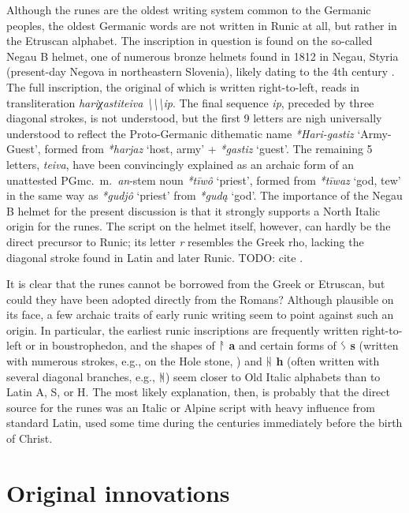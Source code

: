 Although the runes are the oldest writing system common to the Germanic peoples, the oldest Germanic words are not written in Runic at all, but rather in the Etruscan alphabet.  The inscription in question is found on the so-called Negau B helmet, one of numerous bronze helmets found in 1812 in Negau, Styria (present-day Negova in northeastern Slovenia), likely dating to the 4th century \bce.  The full inscription, the original of which is written right-to-left, reads in transliteration \emph{hariχastiteiva \textbackslash\textbackslash\textbackslash ip}.  The final sequence \emph{ip}, preceded by three diagonal strokes, is not understood, but the first 9 letters are nigh universally understood to reflect the Proto-Germanic dithematic name \emph{*Hari-gastiz} ‘Army-Guest’, formed from \emph{*harjaz} ‘host, army’ + \emph{*gastiz} ‘guest’.  The remaining 5 letters, \emph{teiva}, have been convincingly explained as an archaic form of an unattested PGmc.~m.~\emph{an}-stem noun \emph{*tīwô} ‘priest’, formed from \emph{*tīwaz} ‘god, tew’ in the same way as \emph{*gudjô} ‘priest’ from \emph{*gudą} ‘god’.  The importance of the Negau B helmet for the present discussion is that it strongly supports a North Italic origin for the runes.  The script on the helmet itself, however, can hardly be the direct precursor to Runic; its letter \emph{r} resembles the Greek rho, lacking the diagonal stroke found in Latin and later Runic.
TODO: cite \textcite{Markey2001}.

It is clear that the runes cannot be borrowed from the Greek or Etruscan, but could they have been adopted directly from the Romans?  Although plausible on its face, a few archaic traits of early runic writing seem to point against such an origin.  In particular, the earliest runic inscriptions are frequently written right-to-left or in boustrophedon, and the shapes of ᚨ \textbf{a} and certain forms of ᛊ \textbf{s} (written with numerous strokes, e.g., on the Hole stone, \cite{ZilmerVasshus2023}) and ᚺ \textbf{h} (often written with several diagonal branches, e.g., ᚻ) seem closer to Old Italic alphabets than to Latin A, S, or H.  The most likely explanation, then, is probably that the direct source for the runes was an Italic or Alpine script with heavy influence from standard Latin, used some time during the centuries immediately before the birth of Christ.

\section{Original innovations}

